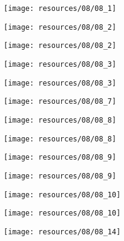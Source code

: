 \begin{frame}{ }
    \centering
    \texttt{[image: resources/08/08\_1]}
\end{frame}
\begin{frame}{ }
    \centering
    \texttt{[image: resources/08/08\_2]}
\end{frame}
\begin{frame}{ }
    \centering
    \texttt{[image: resources/08/08\_2]}
\end{frame}
\begin{frame}{ }
    \centering
    \texttt{[image: resources/08/08\_3]}
\end{frame}
\begin{frame}{ }
    \centering
    \texttt{[image: resources/08/08\_3]}
\end{frame}
\begin{frame}{ }
    \centering
    \texttt{[image: resources/08/08\_7]}
\end{frame}
\begin{frame}{ }
    \centering
    \texttt{[image: resources/08/08\_8]}
\end{frame}
\begin{frame}{ }
    \centering
    \texttt{[image: resources/08/08\_8]}
\end{frame}
\begin{frame}{ }
    \centering
    \texttt{[image: resources/08/08\_9]}
\end{frame}
\begin{frame}{ }
    \centering
    \texttt{[image: resources/08/08\_9]}
\end{frame}
\begin{frame}{ }
    \centering
    \texttt{[image: resources/08/08\_10]}
\end{frame}
\begin{frame}{ }
    \centering
    \texttt{[image: resources/08/08\_10]}
\end{frame}
\begin{frame}{ }
    \centering
    \texttt{[image: resources/08/08\_14]}
\end{frame}
